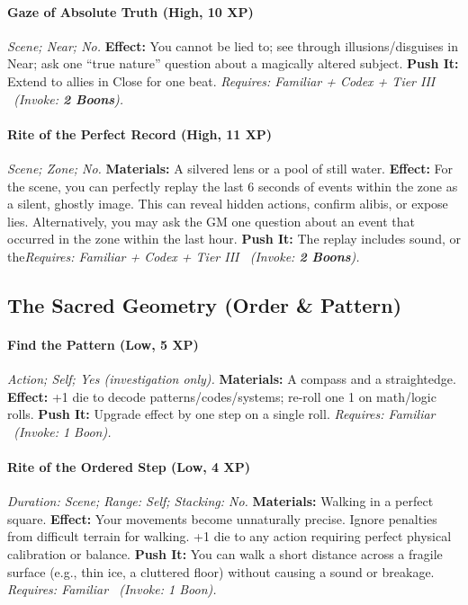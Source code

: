 \documentclass[12pt,twoside]{book}
\begin{document}
\paragraph{Gaze of Absolute Truth (High, 10 XP)} \emph{Scene; Near; No.}
\textbf{Effect:} You cannot be lied to; see through illusions/disguises in Near; ask one ``true nature'' question about a magically altered subject.
\textbf{Push It:} Extend to allies in Close for one beat.
\emph{Requires: Familiar + Codex + Tier III \ (\textit{Invoke:} \textbf{2 Boons}).}
\paragraph{Rite of the Perfect Record (High, 11 XP)} \emph{Scene; Zone; No.}
\textbf{Materials:} A silvered lens or a pool of still water.
\textbf{Effect:} For the scene, you can perfectly replay the last 6 seconds of events within the zone as a silent, ghostly image. This can reveal hidden actions, confirm alibis, or expose lies. Alternatively, you may ask the GM one question about an event that occurred in the zone within the last hour.
\textbf{Push It:} The replay includes sound, or the\emph{Requires: Familiar + Codex + Tier III \ (\textit{Invoke:} \textbf{2 Boons}).}

\subsection{The Sacred Geometry (Order \& Pattern)}
\paragraph{Find the Pattern (Low, 5 XP)} \emph{Action; Self; Yes (investigation only).}
\textbf{Materials:} A compass and a straightedge.
\textbf{Effect:} +1 die to decode patterns/codes/systems; re-roll one 1 on math/logic rolls.
\textbf{Push It:} Upgrade effect by one step on a single roll.
\emph{Requires: Familiar \ (\textit{Invoke:} 1 Boon).}
\paragraph{Rite of the Ordered Step (Low, 4 XP)} \emph{Duration: Scene; Range: Self; Stacking: No.}
\textbf{Materials:} Walking in a perfect square.
\textbf{Effect:} Your movements become unnaturally precise. Ignore penalties from difficult terrain for walking. +1 die to any action requiring perfect physical calibration or balance.
\textbf{Push It:} You can walk a short distance across a fragile surface (e.g., thin ice, a cluttered floor) without causing a sound or breakage.
\emph{Requires: Familiar \ (\textit{Invoke:} 1 Boon).}
\end{document}
